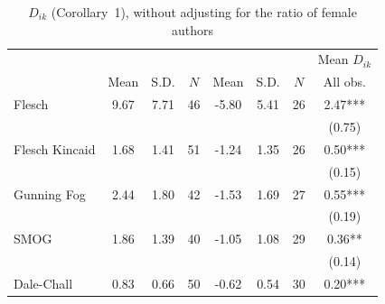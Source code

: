 \begin{table}[H]
    \footnotesize
    \centering
    \begin{threeparttable}
        \caption{\(D_{ik}\) (Corollary~1), without adjusting for the ratio of female authors}
        \label{table8_R}
        \begin{tabular}{p{3cm}S[table-format=3.3]@{}S[table-format=3.3]@{}S[table-format=3.2]@{}S[table-format=4.3]@{}S[table-format=3.3]@{}S[table-format=3.1]@{}S@{}}
            \toprule
            &&&{{Mean \(D_{ik}\)}}\\\cmidrule(lr){2-4}\cmidrule(lr){5-7}\cmidrule(lr){8-8}&{{Mean}}&{{S.D.}}&{{\(N\)}}&{{Mean}}&{{S.D.}}&{{\(N\)}}&{{All obs.}}\\
            \midrule
            Flesch                        &        9.67&        7.71&          46&       -5.80&        5.41&          26&        2.47***\\
                                          &            &            &            &            &            &            &      {(0.75)}   \\
            Flesch Kincaid                &        1.68&        1.41&          51&       -1.24&        1.35&          26&        0.50***\\
                                          &            &            &            &            &            &            &      {(0.15)}   \\
            Gunning Fog                   &        2.44&        1.80&          42&       -1.53&        1.69&          27&        0.55***\\
                                          &            &            &            &            &            &            &      {(0.19)}   \\
            SMOG                          &        1.86&        1.39&          40&       -1.05&        1.08&          29&        0.36** \\
                                          &            &            &            &            &            &            &      {(0.14)}   \\
            Dale-Chall                    &        0.83&        0.66&          50&       -0.62&        0.54&          30&        0.20***\\

\end{tabular}
\end{threeparttable}
\end{table}
